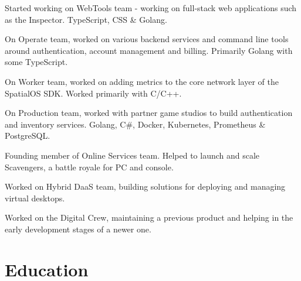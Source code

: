 \documentclass[]{deedy-resume-openfont}
\begin{document}
\begin{minipage}[t]{0.63\textwidth}
\begin{tightemize}
\item Started working on WebTools team - working on full-stack web applications such as the Inspector. TypeScript, CSS \& Golang.
\item On Operate team, worked on various backend services and command line tools around authentication, account management and billing. Primarily Golang with some TypeScript.
\item On Worker team, worked on adding metrics to the core network layer of the SpatialOS SDK. Worked primarily with C/C++.
\item On Production team, worked with partner game studios to build authentication and inventory services. Golang, C\#, Docker, Kubernetes, Prometheus \& PostgreSQL.
\item Founding member of Online Services team. Helped to launch and scale Scavengers, a battle royale for PC and console.
\end{tightemize}
\sectionsep

\begin{tightemize}
\item Worked on Hybrid DaaS team, building solutions for deploying and managing virtual desktops.
\end{tightemize}
\sectionsep

\begin{tightemize}
\item Worked on the Digital Crew, maintaining a previous product and helping in the early development stages of a newer one.
\end{tightemize}
\sectionsep


\section{Education}
\sectionsep{}

\end{minipage} 
\end{document}
